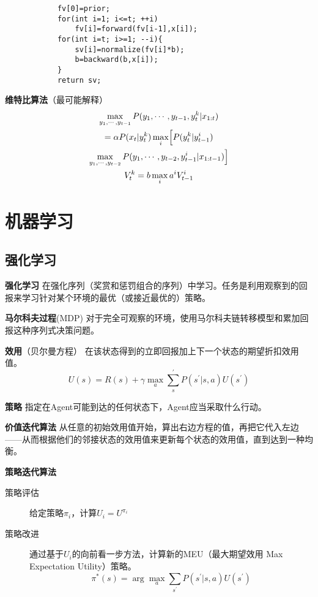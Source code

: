 \documentclass[10pt,a4paper]{ctexart}
\begin{document}
\begin{multicols}{3}
\begin{lstlisting}
            fv[0]=prior;
            for(int i=1; i<=t; ++i)
                fv[i]=forward(fv[i-1],x[i]);
            for(int i=t; i>=1; --i){
                sv[i]=normalize(fv[i]*b);
                b=backward(b,x[i]);
            }
            return sv;
        \end{lstlisting}
        \textbf{维特比算法}（最可能解释）
        \begin{multline*}
            \max_{y_1,\cdots,y_{t-1}}P(y_1,\cdots,y_{t-1},y_{t}^k|x_{1:t})\\
            =\alpha P(x_{t}|y_{t}^k)\max_{i}\Bigl[P(y_{t}^k|y_{t-1}^i)\\\max_{y_1,\cdots,y_{t-2}}P(y_1,\cdots,y_{t-2},y_{t-1}^i|x_{1:t-1})\Bigr]\\
            V_{t}^k=b\max_i a^i V_{t-1}^i
        \end{multline*}

        \section{机器学习}
        \subsection{强化学习}
        \textbf{强化学习}
        在强化序列（奖赏和惩罚组合的序列）中学习。任务是利用观察到的回报来学习针对某个环境的最优（或接近最优的）策略。

        \textbf{马尔科夫过程}(MDP)
        对于完全可观察的环境，使用马尔科夫链转移模型和累加回报这种序列式决策问题。

        \textbf{效用}（贝尔曼方程）
        在该状态得到的立即回报加上下一个状态的期望折扣效用值。
        \begin{equation*}
            U(s)=R(s)+\gamma\max_a\sum_s^\prime P(s^\prime|s,a)U(s^\prime)
        \end{equation*}

        \textbf{策略}
        指定在Agent可能到达的任何状态下，Agent应当采取什么行动。

        \textbf{价值迭代算法}
        从任意的初始效用值开始，算出右边方程的值，再把它代入左边------从而根据他们的邻接状态的效用值来更新每个状态的效用值，直到达到一种均衡。

        \textbf{策略迭代算法}
        \begin{description}
            \item[策略评估] 给定策略$\pi_i$，计算$U_i=U^{\pi_i}$
            \item[策略改进] 通过基于$U_i$的向前看一步方法，计算新的MEU（最大期望效用 Max Expectation Utility）策略。 
        \begin{equation*}
            \pi^*(s)=\arg\max_a\sum_{s^\prime}P(s^\prime|s,a)U(s^\prime)
        \end{equation*} 
        \end{description}


\end{multicols}
\end{document}
